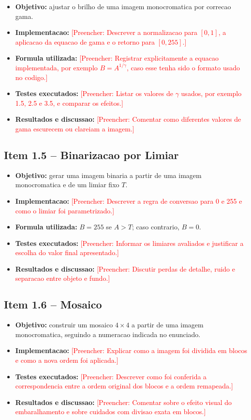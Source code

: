 \documentclass[12pt,a4paper]{article}
\newcommand{\placeholder}[1]{\textcolor{red}{[Preencher: #1]}}
\begin{document}
\begin{itemize}[leftmargin=*]
  \item \textbf{Objetivo:} ajustar o brilho de uma imagem monocromatica por correcao gama.
  \item \textbf{Implementacao:} \placeholder{Descrever a normalizacao para $[0,1]$, a aplicacao da equacao de gama e o retorno para $[0,255]$.}
  \item \textbf{Formula utilizada:} \placeholder{Registrar explicitamente a equacao implementada, por exemplo $B = A^{1/\gamma}$, caso esse tenha sido o formato usado no codigo.}
  \item \textbf{Testes executados:} \placeholder{Listar os valores de $\gamma$ usados, por exemplo 1.5, 2.5 e 3.5, e comparar os efeitos.}
  \item \textbf{Resultados e discussao:} \placeholder{Comentar como diferentes valores de gama escurecem ou clareiam a imagem.}
\end{itemize}

\subsection{Item 1.5 -- Binarizacao por Limiar}

\begin{itemize}[leftmargin=*]
  \item \textbf{Objetivo:} gerar uma imagem binaria a partir de uma imagem monocromatica e de um limiar fixo $T$.
  \item \textbf{Implementacao:} \placeholder{Descrever a regra de conversao para 0 e 255 e como o limiar foi parametrizado.}
  \item \textbf{Formula utilizada:} $B = 255$ se $A > T$; caso contrario, $B = 0$.
  \item \textbf{Testes executados:} \placeholder{Informar os limiares avaliados e justificar a escolha do valor final apresentado.}
  \item \textbf{Resultados e discussao:} \placeholder{Discutir perdas de detalhe, ruido e separacao entre objeto e fundo.}
\end{itemize}

\subsection{Item 1.6 -- Mosaico}

\begin{itemize}[leftmargin=*]
  \item \textbf{Objetivo:} construir um mosaico $4 \times 4$ a partir de uma imagem monocromatica, seguindo a numeracao indicada no enunciado.
  \item \textbf{Implementacao:} \placeholder{Explicar como a imagem foi dividida em blocos e como a nova ordem foi aplicada.}
  \item \textbf{Testes executados:} \placeholder{Descrever como foi conferida a correspondencia entre a ordem original dos blocos e a ordem remapeada.}
  \item \textbf{Resultados e discussao:} \placeholder{Comentar sobre o efeito visual do embaralhamento e sobre cuidados com divisao exata em blocos.}
\end{itemize}
\end{document}
